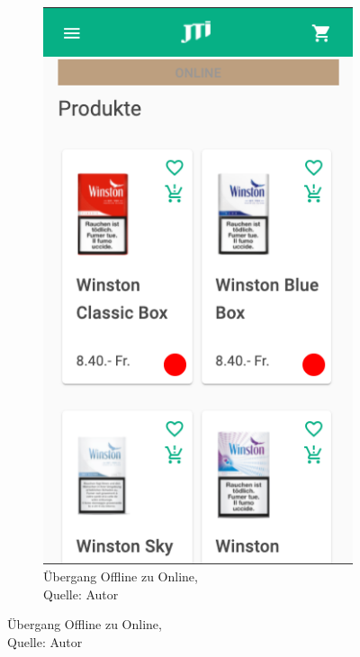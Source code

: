 \begin{figure}[H]
\begin{subfigure}[b]{0.5\textwidth}
		\includegraphics[scale=0.5]{images/backOnline.PNG}
		\caption[Übergang Offline zu Online]{Übergang Offline zu Online,\\ Quelle: Autor}
		\label{img: offlineOnline}
	\end{subfigure}
\end{figure} 


\newpage
